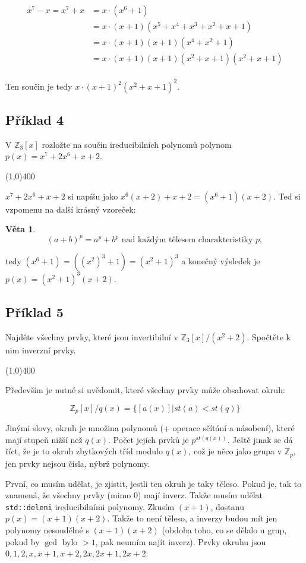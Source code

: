 \documentclass{article}
\newtheorem{veta}{Věta}[section]
\begin{document}
\begin{align*}
x^7 - x  = x^7 + x & = x\cdot(x^6 + 1)\\
				& = x\cdot(x+1)(x^5 + x^4 + x^3 + x^2 + x + 1) \\
				& = x\cdot(x+1)(x+1)(x^4 + x^2 + 1)\\
				& = x\cdot(x+1)(x+1)(x^2 + x + 1)(x^2 + x +1)  \\
\end{align*}

Ten součin je tedy $x\cdot(x+1)^2(x^2 + x + 1)^2$.

\subsection{Příklad 4}
V $\mathbb{Z}_3[x]$ rozložte na součin ireducibilních polynomů polynom $p(x) = x^7 + 2x^6 + x + 2$.

\line(1,0){400}

$x^7 + 2x^6 + x + 2$ si napíšu jako $x^6(x + 2) + x + 2 = (x^6 + 1)(x+2)$. Teď si vzpomenu na další krásný vzoreček:
\begin{veta}
	\[(a+b)^p = a^p + b^p \text{ nad každým tělesem charakteristiky } p,\]
\end{veta}

tedy $(x^6+1) = ((x^2)^3+1) = (x^2+1)^3$ a konečný výsledek je $p(x) = (x^2 + 1)^3(x+2)$.

\subsection{\label{priklad2-5}Příklad 5}
Najděte všechny prvky, které jsou invertibilní v $\mathbb{Z}_3[x]/(x^2 + 2)$. Spočtěte k nim inverzní prvky.

\line(1,0){400}

Především je nutné si uvědomit, které všechny prvky může obsahovat okruh:

\[ \mathbb{Z}_p[x]/q(x) = \{[a(x)] | st(a) < st(q)\} \]

Jinými slovy, okruh je množina polynomů (+ operace sčítání a násobení), které mají stupeň nižší než $q(x)$. Počet jejích prvků je $p^{st(q(x))}$. Ještě jinak se dá říct, že je to okruh zbytkových tříd modulo $q(x)$, což je něco jako grupa v $\mathbb{Z}_p$, jen prvky nejsou čísla, nýbrž polynomy.

První, co musím udělat, je zjistit, jestli ten okruh je taky těleso. Pokud je, tak to znamená, že všechny prvky (mimo $0$) mají inverz. Takže musím udělat \texttt{std::deleni} ireducibilními polynomy. Zkusím $(x+1)$, dostanu $p(x) = (x + 1)(x + 2)$. Takže to není těleso, a inverzy budou mít jen polynomy nesoudělné s $(x + 1)(x + 2)$ (obdoba toho, co se dělalo u grup, pokud by $\gcd$ bylo $> 1$, pak neumím najít inverz). Prvky okruhu jsou $0,1,2,x,x+1,x+2,2x,2x+1,2x+2$: 
\end{document}
